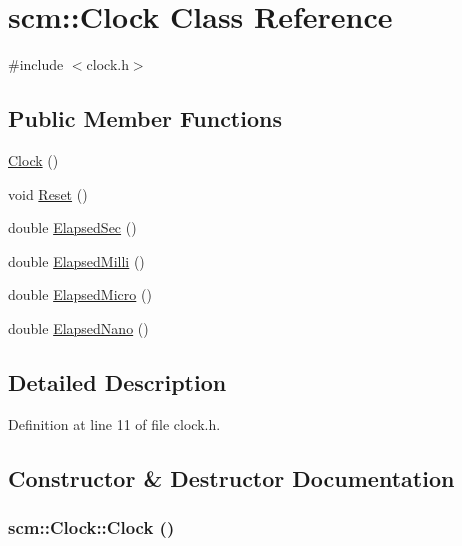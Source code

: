 \hypertarget{classscm_1_1_clock}{
\section{scm::Clock Class Reference}
\label{classscm_1_1_clock}
}


{\ttfamily \#include $<$clock.h$>$}

\subsection*{Public Member Functions}
\begin{DoxyCompactItemize}
\item 
\hyperlink{classscm_1_1_clock_a8d74f05ccdc06fb6c0ceb9a9304523d4}{Clock} ()
\item 
void \hyperlink{classscm_1_1_clock_a2cba6acacbe895ce53d40c25bc156427}{Reset} ()
\item 
double \hyperlink{classscm_1_1_clock_a69a85c72b329ac5840f0dcea13167c70}{ElapsedSec} ()
\item 
double \hyperlink{classscm_1_1_clock_a84f0eb2cc75d6354da139aaf23affe84}{ElapsedMilli} ()
\item 
double \hyperlink{classscm_1_1_clock_a4aa1a9c3a67a29ea36df1d96c4e704a8}{ElapsedMicro} ()
\item 
double \hyperlink{classscm_1_1_clock_a088b92be330ad4be554ad0af3f60423d}{ElapsedNano} ()
\end{DoxyCompactItemize}


\subsection{Detailed Description}


Definition at line 11 of file clock.h.



\subsection{Constructor \& Destructor Documentation}
\hypertarget{classscm_1_1_clock_a8d74f05ccdc06fb6c0ceb9a9304523d4}{
\subsubsection[{Clock}]{\setlength{\rightskip}{0pt plus 5cm}scm::Clock::Clock ()}}
\label{classscm_1_1_clock_a8d74f05ccdc06fb6c0ceb9a9304523d4}


